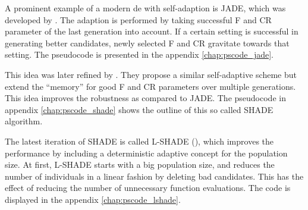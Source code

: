 \documentclass[./\jobname.tex]{subfiles}
\begin{document}
A prominent example of a modern \gls{de} with self-adaption is JADE, which was developed by \cite{zhang_jade_2009}. The adaption is performed by taking successful F and CR parameter of the last generation into account. If a certain setting is successful in generating better candidates, newly selected F and CR gravitate towards that setting. The pseudocode is presented in the appendix \ref{chap:pscode_jade}. 

This idea was later refined by \cite{tanabe_success-history_2013}. They propose a similar self-adaptive scheme but extend the ``memory'' for good F and CR parameters over multiple generations. This idea improves the robustness as compared to JADE. The pseudocode in appendix \ref{chap:pscode_shade} shows the outline of this so called SHADE algorithm. 

The latest iteration of SHADE is called L-SHADE (\cite{tanabe_improving_2014}), which improves the performance by including a deterministic adaptive concept for the population size. At first, L-SHADE starts with a big population size, and reduces the number of individuals in a linear fashion by deleting bad candidates. This has the effect of reducing the number of unnecessary function evaluations. The code is displayed in the appendix \ref{chap:pscode_lshade}. 
\end{document}
